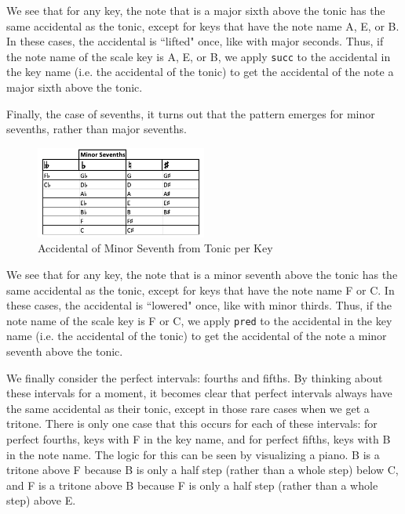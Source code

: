 \documentclass{report}
\begin{document}
We see that for any key, the note that is a major sixth above the tonic has the same accidental as the tonic, except for keys that have the note name A, E, or B. In these  cases, the accidental is ``lifted" once, like with major seconds. Thus, if the note name of the scale key is A, E, or B, we apply \verb.succ. to the accidental in the key name (i.e. the accidental of the tonic) to get the accidental of the note a major sixth above the tonic.

Finally, the case of sevenths, it turns out that the pattern emerges for minor sevenths, rather than major sevenths.
\newpage

\begin{figure}[h!]
\centering
\includegraphics[width=0.5\textwidth]{images/min_sevenths}
\caption{Accidental of Minor Seventh from Tonic per Key}
\label{min_sevenths}
\end{figure}

We see that for any key, the note that is a minor seventh above the tonic has the same accidental as the tonic, except for keys that have the note name F or C. In these  cases, the accidental is ``lowered" once, like with minor thirds. Thus, if the note name of the scale key is F or C, we apply \verb.pred. to the accidental in the key name (i.e. the accidental of the tonic) to get the accidental of the note a minor seventh above the tonic.

We finally consider the perfect intervals: fourths and fifths. By thinking about these intervals for a moment, it becomes clear that perfect intervals always have the same accidental as their tonic, except in those rare cases when we get a tritone. There is only one case that this occurs for each of these intervals: for perfect fourths, keys with F in the key name, and for perfect fifths, keys with B in the note name. The logic for this can be seen by visualizing a piano. B is a tritone above F because B is only a half step (rather than a whole step) below C, and F is a tritone above B because F is only a half step (rather than a whole step) above E.

                        
\end{document}
